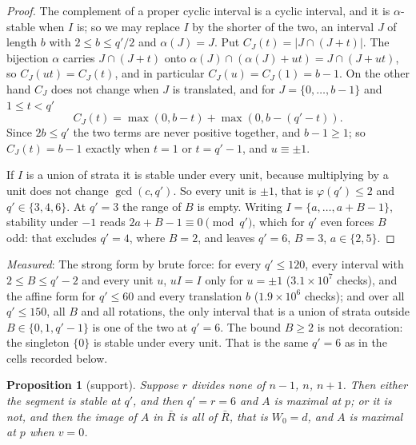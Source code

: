 \documentclass[11pt,a4paper]{article}
\newtheorem{proposition}[theorem]{Proposition}
\theoremstyle{definition}
\newcommand{\medido}[1]{\emph{Measured}: #1}
\begin{document}
\begin{proof}
The complement of a proper cyclic interval is a cyclic interval, and it is $\alpha$-stable when $I$
is; so we may replace $I$ by the shorter of the two, an interval $J$ of length $b$ with
$2\le b\le q'/2$ and $\alpha(J)=J$. Put $C_J(t)=|J\cap(J+t)|$. The bijection $\alpha$ carries
$J\cap(J+t)$ onto $\alpha(J)\cap(\alpha(J)+ut)=J\cap(J+ut)$, so $C_J(ut)=C_J(t)$, and in
particular $C_J(u)=C_J(1)=b-1$. On the other hand $C_J$ does not change when $J$ is translated, and for
$J=\{0,\dots,b-1\}$ and $1\le t<q'$
\[
C_J(t)=\max(0,b-t)+\max(0,b-(q'-t)).
\]
Since $2b\le q'$ the two terms are never positive together, and $b-1\ge1$; so $C_J(t)=b-1$
exactly when $t=1$ or $t=q'-1$, and $u\equiv\pm1$.

If $I$ is a union of strata it is stable under every unit, because multiplying by a unit does not
change $\gcd(c,q')$. So every unit is $\pm1$, that is $\varphi(q')\le2$ and $q'\in\{3,4,6\}$. At
$q'=3$ the range of $B$ is empty. Writing $I=\{a,\dots,a+B-1\}$, stability under $-1$ reads
$2a+B-1\equiv0\pmod{q'}$, which for $q'$ even forces $B$ odd: that excludes $q'=4$, where $B=2$,
and leaves $q'=6$, $B=3$, $a\in\{2,5\}$.
\end{proof}

\medido{The strong form by brute force: for every $q'\le120$, every interval with
$2\le B\le q'-2$ and every unit $u$, $uI=I$ only for $u=\pm1$ ($3.1\times10^7$ checks), and the
affine form for $q'\le60$ and every translation $b$ ($1.9\times10^6$ checks); and over
all $q'\le150$, all $B$ and all rotations, the only interval that is a union of strata outside
$B\in\{0,1,q'-1\}$ is one of the two at $q'=6$. The bound $B\ge2$ is not decoration: the singleton
$\{0\}$ is stable under every unit. That is the same $q'=6$ as in the cells recorded below.}

\begin{proposition}[support]\label{prop:sop}
Suppose $r$ divides none of $n-1$, $n$, $n+1$. Then either the segment is stable at $q'$, and then
$q'=r=6$ and $A$ is maximal at $p$; or it is not, and then the image of $A$ in $\bar R$ is all of
$\bar R$, that is $W_0=d$, and $A$ is maximal at $p$ when $v=0$.
\end{proposition}
\end{document}
